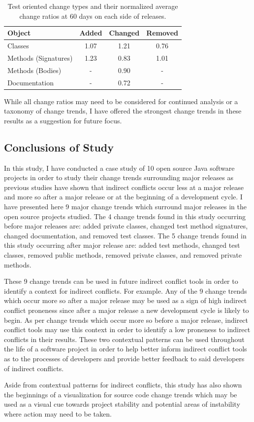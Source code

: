 \begin{table}[ht]
\begin{center}
\begin{tabular}{| l | c | c | c |}
\hline
Object & Added & Changed & Removed\\
\hline
Classes & 1.07 & 1.21 & 0.76 \\
Methods (Signatures) & 1.23 & 0.83 & 1.01 \\
Methods (Bodies) & - & 0.90 & - \\
Documentation & - & 0.72 & - \\
\hline
\end{tabular}
\end{center}
\caption{Test oriented change types and their normalized average change ratios at 60 days on each side of releases. \label{tab:test}}
\end{table}

While all change ratios may need to be considered for continued analysis or a taxonomy of change trends, I have offered the strongest
change trends in these results as a suggestion for future focus.

\subsection{Conclusions of Study}

In this study, I have conducted a case study of 10 open source Java software projects in order to study their change trends surrounding
major releases as previous studies have shown that indirect conflicts occur less at a major release and more so after a major release
or at the beginning of a development cycle. I have presented here 9 major change trends which surround major releases in the open source
projects studied. The 4 change trends found in this study occurring before major releases are: added private classes, 
changed test method signatures, changed documentation, and removed test classes.
The 5 change trends found in this study occurring after major release are: added test methods, changed test classes, removed public methods, removed
private classes, and removed private methods.

These 9 change trends can be used in future indirect conflict tools in order to identify a context for indirect conflicts.
For example. Any of the 9 change trends which occur more so after a major release may be used as a sign of high indirect conflict proneness
since after a major release a new development cycle is likely to begin. As per change trends which occur more so before a major release, indirect
conflict tools may use this context in order to identify a low proneness to indirect conflicts in their results. These two contextual patterns
can be used throughout the life of a software project in order to help better inform indirect conflict tools as to the processes of developers
and provide better feedback to said developers of indirect conflicts.

Aside from contextual patterns for indirect conflicts, this study has also shown the beginnings of a visualization for source code change trends which may
be used as a visual cue towards project stability and potential areas of instability where action may need to be taken.